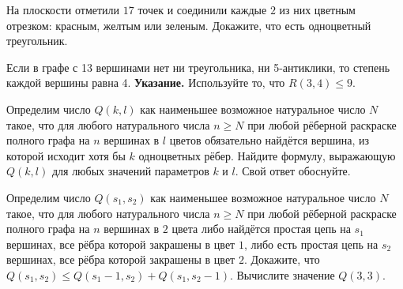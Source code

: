 На плоскости отметили $17$ точек и соединили каждые $2$ из них цветным отрезком: красным, желтым или зеленым.
Докажите, что есть одноцветный треугольник.

Если в графе с 13 вершинами нет ни треугольника, ни 5-антиклики, то степень каждой вершины равна 4. \textbf{Указание.} Используйте то, что $R(3,4)\le 9.$

Определим число $Q(k,l)$ как наименьшее возможное натуральное число $N$ такое, что для любого натурального числа $n\ge N$ при любой рёберной раскраске полного графа на $n$ вершинах в $l$ цветов обязательно найдётся вершина, из которой исходит хотя бы $k$ одноцветных рёбер. Найдите формулу, выражающую $Q(k,l)$ для любых значений параметров $k$ и $l$. Свой ответ обоснуйте.

Определим число $Q(s_1,s_2)$ как наименьшее возможное натуральное число $N$ такое, что для любого натурального числа $n\ge N$ при любой рёберной раскраске полного графа на $n$ вершинах в $2$ цвета либо найдётся простая цепь на $s_1$ вершинах, все рёбра которой закрашены в цвет $1$, либо есть простая цепь на $s_2$ вершинах, все рёбра которой закрашены в цвет $2$. Докажите, что $Q(s_1,s_2)\le Q(s_1-1,s_2)+Q(s_1,s_2-1)$. Вычислите значение $Q(3,3).$



